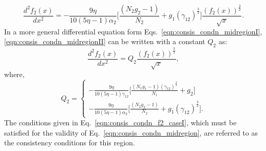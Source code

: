 \documentclass[fleqn]{article}
\begin{document}
            \begin{equation}
                 \frac{d^2 f_2(x)}{dx^2}= - \frac{9\eta}{10(5\eta-1)\alpha_2}\biggl[\frac{(N_2 g_2-1)}{N_2} 
                 + g_1 (\gamma_{12})^\frac{3}{2} \biggr]\frac{\left( f_2(x) \right)^\frac{3}{2}}{\sqrt{x}}.
                 \label{eqn:consis_condn_midregionII}
            \end{equation}
            In a more general differential equation form Eqs.~\eqref{eqn:consis_condn_midregionI},  \eqref{eqn:consis_condn_midregionII} can be written with a constant $Q_2$ as: 
            \begin{equation}
                 \frac{d^2f_2(x)}{dx^2} = Q_2 \frac{\left(f_2(x)\right)^\frac{3}{2}}{\sqrt{x}},
                  \label{eqn:consis_condn_midregion}
            \end{equation}
            where, 
            \begin{equation}
            Q_2 = \left\{
                \begin{aligned}     
                    -\frac{9\eta}{10(5\eta-1)  \gamma_{12} }\biggl[\frac{(N_1 g_1-1)(\gamma_{12})^\frac{3}{2}}{N_1} + g_2 \biggr]\\ 
                    -\frac{9\eta}{10(5\eta-1)\alpha_2}\biggl[\frac{(N_2 g_2-1)}{N_2} 
                    + g_1 (\gamma_{12})^\frac{3}{2} \biggr].
                \end{aligned}
                \right. \label{eqn:consis_condn_f2_caseI}
            \end{equation}
            The conditions given in Eq.~\eqref{eqn:consis_condn_f2_caseI}, which must be satisfied for the validity of Eq.~\eqref{eqn:consis_condn_midregion}, are referred to as the consistency conditions for this region. 
\end{document}
